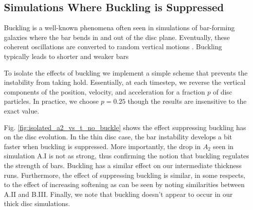
\subsection{Simulations Where Buckling is Suppressed}\label{sec:buckling}

Buckling is a well-known phenomena often seen in simulations of
bar-forming galaxies where the bar bends in and out of the disc plane.
Eventually, these coherent oscillations are converted to random
vertical motions \citep{BT}.  Buckling typically leads to shorter and
weaker bars \citep{VP2004, debattista_2006}

To isolate the effects of buckling we implement a simple scheme
that prevents the instability from taking hold.  Essentially, at
each timestep, we reverse the vertical components of the position,
velocity, and acceleration for a fraction $p$ of disc particles.
In practice, we choose $p=0.25$ though the results are insensitive
to the exact value.

Fig. \ref{fig:isolated_a2_vs_t_no_buckle} shows the effect suppressing
buckling has on the disc evolution.  In the thin disc case, the bar
instability develops a bit faster when buckling is suppressed.  More
importantly, the drop in $A_2$ seen in simulation A.I is not as strong,
thus confirming the notion that buckling regulates the strength of
bars.  Buckling has a similar effect on our intermediate thickness
runs.  Furthermore, the effect of suppressing buckling is similar, in
some respects, to the effect of increasing softening as can be seen by
noting similarities between A.II and B.III.  Finally, we note that
buckling doesn't appear to occur in our thick disc simulations.

